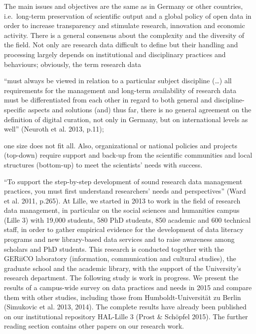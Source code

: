 \documentclass[a4paper,
fontsize=11pt,
oneside,
numbers=noperiodatend,
parskip=half-,
bibliography=totoc,
final
]{scrartcl}
\begin{document}
The main issues and objectives are the same as in Germany or other
countries, i.e.~long-term preservation of scientific output and a global
policy of open data in order to increase transparency and stimulate
research, innovation and economic activity. There is a general consensus
about the complexity and the diversity of the field. Not only are
research data difficult to define but their handling and processing
largely depends on institutional and disciplinary practices and
behaviours; obviously, the term research data

\enquote{must always be viewed in relation to a particular subject
discipline (\ldots{}) all requirements for the management and long-term
availability of research data must be differentiated from each other in
regard to both general and discipline-specific aspects and solutions
(and) thus far, there is no general agreement on the definition of
digital curation, not only in Germany, but on international levels as
well} (Neuroth et al. 2013, p.11);

one size does not fit all. Also, organizational or national policies and
projects (top-down) require support and back-up from the scientific
communities and local structures (bottom-up) to meet the scientists'
needs with success.

\enquote{To support the step-by-step development of sound research data
management practices, you must first understand researchers' needs and
perspectives} (Ward et al. 2011, p.265). At Lille, we started in 2013 to
work in the field of research data management, in particular on the
social sciences and humanities campus (Lille 3) with 19,000 students,
580 PhD students, 850 academic and 600 technical staff, in order to
gather empirical evidence for the development of data literacy programs
and new library-based data services and to raise awareness among
scholars and PhD students. This research is conducted together with the
GERiiCO laboratory (information, communication and cultural studies),
the graduate school and the academic library, with the support of the
University's research department. The following study is work in
progress. We present the results of a campus-wide survey on data
practices and needs in 2015 and compare them with other studies,
including those from Humboldt-Universität zu Berlin (Simukovic et al.
2013, 2014). The complete results have already been published on our
institutional repository HAL-Lille 3 (Prost \& Schöpfel 2015). The
further reading section contains other papers on our research work.
\end{document}
